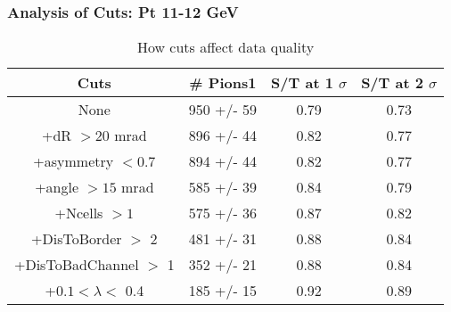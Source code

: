 \frame
{
\frametitle{Analysis of Cuts: Pt 11-12 GeV}
\begin{table}
\caption{How cuts affect data quality}
\centering
\begin{tabular}{c c c c}
\hline\hline
Cuts & \# Pions1 & S/T at 1 $\sigma$ & S/T at 2 $\sigma$ \\ [0.5ex]
\hline
None &  950 +/-   59 & 0.79 & 0.73 \\ %
+dR $> 20$ mrad &  896 +/-   44 & 0.82 & 0.77 \\ %
+asymmetry $< 0.7$ &  894 +/-   44 & 0.82 & 0.77 \\ %
+angle $> 15$ mrad &  585 +/-   39 & 0.84 & 0.79 \\ %
+Ncells $> 1$&  575 +/-   36 & 0.87 & 0.82 \\ %
+DisToBorder $>$ 2 &  481 +/-   31 & 0.88 & 0.84 \\ %
+DisToBadChannel $>$ 1&  352 +/-   21 & 0.88 & 0.84 \\ %
+$0.1 < \lambda <$ 0.4 &  185 +/-   15 & 0.92 & 0.89 \\ %
[1ex]
\hline
\end{tabular}
\label{table:nonlin}
\end{table}
}
